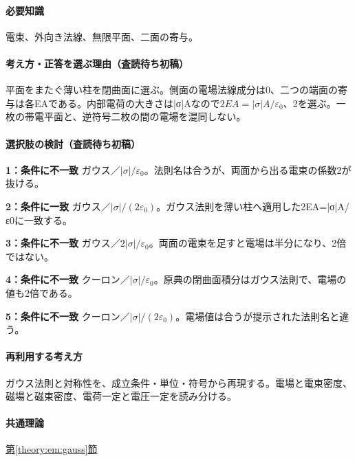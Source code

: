 \paragraph{必要知識} 電束、外向き法線、無限平面、二面の寄与。

\paragraph{考え方・正答を選ぶ理由（査読待ち初稿）} 平面をまたぐ薄い柱を閉曲面に選ぶ。側面の電場法線成分は0、二つの端面の寄与は各EAである。内部電荷の大きさは|σ|Aなので\(2EA=|\sigma|A/\varepsilon_0\)、2を選ぶ。一枚の帯電平面と、逆符号二枚の間の電場を混同しない。

\paragraph{選択肢の検討（査読待ち初稿）}\mbox{}\par

\noindent\textbf{1：条件に不一致} ガウス／\(|\sigma|/\varepsilon_0\)。法則名は合うが、両面から出る電束の係数2が抜ける。\par

\noindent\textbf{2：条件に一致} ガウス／\(|\sigma|/(2\varepsilon_0)\)。ガウス法則を薄い柱へ適用した2EA=|σ|A/ε0に一致する。\par

\noindent\textbf{3：条件に不一致} ガウス／\(2|\sigma|/\varepsilon_0\)。両面の電束を足すと電場は半分になり、2倍ではない。\par

\noindent\textbf{4：条件に不一致} クーロン／\(|\sigma|/\varepsilon_0\)。原典の閉曲面積分はガウス法則で、電場の値も2倍である。\par

\noindent\textbf{5：条件に不一致} クーロン／\(|\sigma|/(2\varepsilon_0)\)。電場値は合うが提示された法則名と違う。\par

\paragraph{再利用する考え方} ガウス法則と対称性を、成立条件・単位・符号から再現する。電場と電束密度、磁場と磁束密度、電荷一定と電圧一定を読み分ける。

\paragraph{共通理論} \hyperref[theory:em:gauss]{第\ref*{theory:em:gauss}節}

